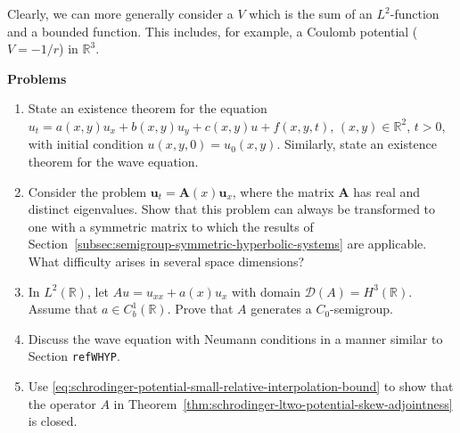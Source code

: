 Clearly, we can more generally consider a $V$ which is the sum of an $L^2$-function and a bounded function. This includes, for example, a Coulomb potential ($V=-1/r$) in $\mathbb{R}^3$.

\textbf{Problems}

\begin{enumerate}[label=\thesection.\arabic*.,ref=\thesection.\arabic*,start=15,series=book-problems]

\item\label{ex:semigroup-transport-and-wave-existence-statements} State an existence theorem for the equation $u_t=a(x,y)u_x+b(x,y)u_y+c(x,y)u+f(x,y,t)$, $(x,y)\in\mathbb{R}^2$, $t>0$, with initial condition $u(x,y,0)=u_0(x,y)$. Similarly, state an existence theorem for the wave equation.

\item\label{ex:strict-hyperbolic-system-symmetric-transformation} Consider the problem $\bm{u}_t=\bm{A}(x)\bm{u}_x$, where the matrix $\bm{A}$ has real and distinct eigenvalues. Show that this problem can always be transformed to one with a symmetric matrix to which the results of Section~\ref{subsec:semigroup-symmetric-hyperbolic-systems} are applicable. What difficulty arises in several space dimensions?

\item\label{ex:second-order-drift-operator-hthree-domain-generation} In $L^2(\mathbb{R})$, let $Au=u_{xx}+a(x)u_x$ with domain $\mathcal{D}(A)=H^3(\mathbb{R})$. Assume that $a\in C_b^1(\mathbb{R})$. Prove that $A$ generates a $C_0$-semigroup.

\item\label{ex:wave-neumann-source-unresolved-refwhyp} Discuss the wave equation with Neumann conditions in a manner similar to Section \texttt{refWHYP}.

\item\label{ex:schrodinger-potential-operator-closedness} Use \eqref{eq:schrodinger-potential-small-relative-interpolation-bound} to show that the operator $A$ in Theorem~\ref{thm:schrodinger-ltwo-potential-skew-adjointness} is closed.

\end{enumerate}
